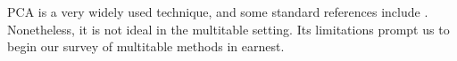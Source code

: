 \documentclass{article}
\begin{document}
PCA is a very widely used technique, and some standard references
include \cite{friedman2001elements, mardia1980multivariate,
  pages2014multiple}. Nonetheless, it is not ideal in the multitable
setting. Its limitations prompt us to begin our survey of multitable
methods in earnest.



\end{document}
